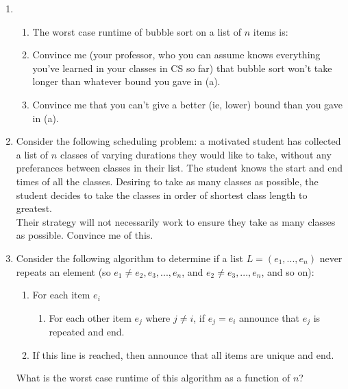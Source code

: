 \documentclass[12pt,letterpaper]{article}
\begin{document}
\begin{enumerate}
	\item \begin{enumerate}
		\item The worst case runtime of bubble sort on a list of $n$ items is:
		\vspace{.3 in}
		\item Convince me (your professor, who you can assume knows everything you've learned in your classes in CS so far) that bubble sort won't take longer than whatever bound you gave in (a). 
		\vspace{1.5 in}
		\item Convince me that you can't give a better (ie, lower) bound than you gave in (a).
		\vspace{1.5 in}
	\end{enumerate}
	\newpage
	\item Consider the following scheduling problem: a motivated student has collected a list of $n$ classes of varying durations they would like to take, without any preferances between classes in their list. The student knows the start and end times of all the classes. Desiring to take as many classes as possible, the student decides to take the classes in order of shortest class length to greatest. \\Their strategy will not necessarily work to ensure they take as many classes as possible. Convince me of this. 
	\vspace{3 in}
	\item Consider the following algorithm to determine if a list $L = (e_1, ..., e_n)$ never repeats an element (so $e_1\neq e_2, e_3, ..., e_n$, and $e_2\neq e_3, ..., e_n$, and so on): 
	\begin{enumerate}[label=\roman*)]
		\item For each item $e_i$
		\begin{enumerate}[label=\alph*)]
			\item For each other item $e_j$ where $j\neq i$, if $e_j = e_i$ announce that $e_j$ is repeated and end. 
		\end{enumerate}
		\item If this line is reached, then announce that all items are unique and end. 
	\end{enumerate}
	What is the worst case runtime of this algorithm as a function of $n$? 
\end{enumerate}
\end{document}

